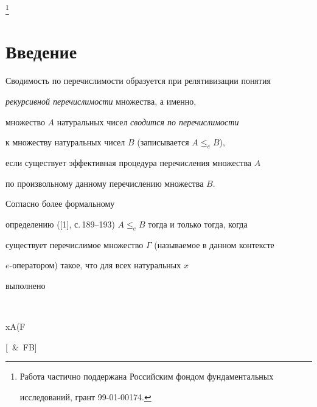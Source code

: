 \thanks{Работа частично поддержана Российским фондом фундаментальных


исследований, грант 99-01-00174.}





\date{}




\pagestyle{plain} %







\maketitle


\label{begin}





\section{Введение}





Сводимость по перечислимости образуется при релятивизации понятия


{\it рекурсивной перечислимости} множества, а именно, 


множество $A$ натуральных чисел {\it сводится по перечислимости}


к множеству натуральных чисел $B$ (записывается $A\le_e B$),


если существует эффективная процедура перечисления множества $A$


по произвольному данному перечислению множества $B$.


Согласно более формальному 


определению ([1], с.\,189--193) $A\le_e B$ тогда и только тогда, когда


существует перечислимое множество $\Gamma$ (называемое в данном контексте


$e$-оператором) такое, что для всех натуральных $x$


выполнено


$$


x\in A\Leftrightarrow (\exists F


[\in \Gamma\, \&\, F\subseteq B]


